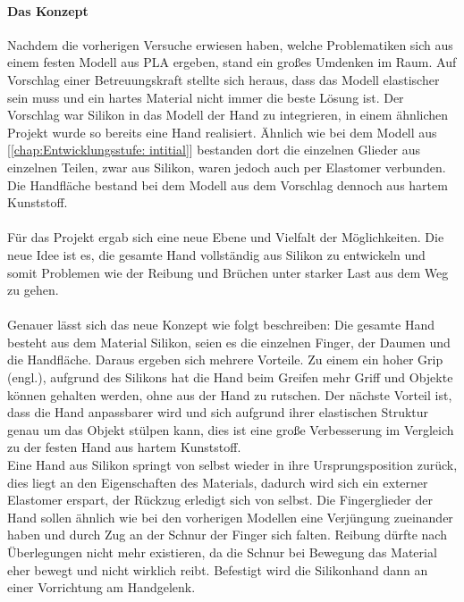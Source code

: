 \documentclass[titlepage,12pt,twoside]{article}
\begin{document}
\paragraph{Das Konzept}
\hfill \break
\hfill \break
Nachdem die vorherigen Versuche erwiesen haben, welche Problematiken sich aus einem festen Modell aus PLA ergeben, stand ein großes Umdenken im Raum. Auf Vorschlag einer Betreuungskraft stellte sich heraus, dass das Modell elastischer sein muss und 
ein hartes Material nicht immer die beste Lösung ist. Der Vorschlag war Silikon in das Modell der Hand zu integrieren, in einem ähnlichen Projekt wurde so bereits eine Hand realisiert. Ähnlich wie bei dem Modell aus [\textcolor{blue}{\autoref{chap:Entwicklungsstufe: intitial}}] bestanden 
dort die einzelnen Glieder aus einzelnen Teilen, zwar aus Silikon, waren jedoch auch per Elastomer verbunden. Die Handfläche bestand bei dem Modell aus dem Vorschlag dennoch aus hartem Kunststoff. \\
\\
Für das Projekt  ergab sich eine neue Ebene und Vielfalt der Möglichkeiten. Die neue Idee ist es, die gesamte Hand vollständig aus Silikon zu entwickeln und somit Problemen wie der Reibung und Brüchen unter starker Last aus dem 
Weg zu gehen. \\
\\
Genauer lässt sich das neue Konzept wie folgt beschreiben: Die gesamte Hand besteht aus dem Material Silikon, seien es die einzelnen Finger, der Daumen und die Handfläche. Daraus ergeben sich mehrere Vorteile. Zu einem ein hoher Grip (engl.), aufgrund des 
Silikons hat die Hand beim Greifen mehr Griff und Objekte können gehalten werden, ohne aus der Hand zu rutschen. Der nächste Vorteil ist, dass die Hand anpassbarer wird und sich aufgrund ihrer elastischen Struktur genau um das Objekt stülpen kann, 
dies ist eine große Verbesserung im Vergleich zu der festen Hand aus hartem Kunststoff. \\
Eine Hand aus Silikon springt von selbst wieder in ihre Ursprungsposition zurück, dies liegt an den Eigenschaften des Materials, dadurch wird sich ein externer Elastomer erspart, der Rückzug erledigt sich von selbst. Die Fingerglieder der Hand sollen 
ähnlich wie bei den vorherigen Modellen eine Verjüngung zueinander haben und durch Zug an der Schnur der Finger sich falten. Reibung dürfte nach Überlegungen nicht mehr existieren, da die Schnur bei Bewegung das Material eher bewegt und nicht wirklich 
reibt. Befestigt wird die Silikonhand dann an einer Vorrichtung am Handgelenk. \\
\\
\end{document}
